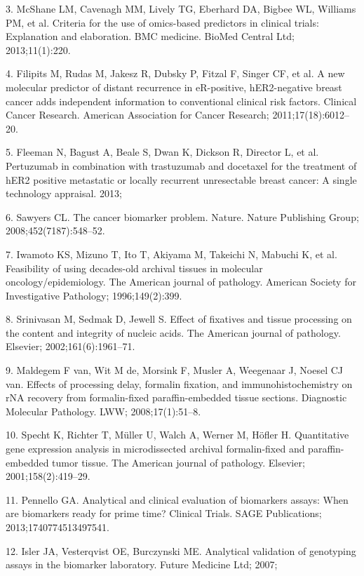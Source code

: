 \documentclass[11pt]{article}
\begin{document}
3. McShane LM, Cavenagh MM, Lively TG, Eberhard DA, Bigbee WL, Williams
PM, et al. Criteria for the use of omics-based predictors in clinical
trials: Explanation and elaboration. BMC medicine. BioMed Central Ltd;
2013;11(1):220.

4. Filipits M, Rudas M, Jakesz R, Dubsky P, Fitzal F, Singer CF, et al.
A new molecular predictor of distant recurrence in eR-positive,
hER2-negative breast cancer adds independent information to conventional
clinical risk factors. Clinical Cancer Research. American Association
for Cancer Research; 2011;17(18):6012--20.

5. Fleeman N, Bagust A, Beale S, Dwan K, Dickson R, Director L, et al.
Pertuzumab in combination with trastuzumab and docetaxel for the
treatment of hER2 positive metastatic or locally recurrent unresectable
breast cancer: A single technology appraisal. 2013;

6. Sawyers CL. The cancer biomarker problem. Nature. Nature Publishing
Group; 2008;452(7187):548--52.

7. Iwamoto KS, Mizuno T, Ito T, Akiyama M, Takeichi N, Mabuchi K, et al.
Feasibility of using decades-old archival tissues in molecular
oncology/epidemiology. The American journal of pathology. American
Society for Investigative Pathology; 1996;149(2):399.

8. Srinivasan M, Sedmak D, Jewell S. Effect of fixatives and tissue
processing on the content and integrity of nucleic acids. The American
journal of pathology. Elsevier; 2002;161(6):1961--71.

9. Maldegem F van, Wit M de, Morsink F, Musler A, Weegenaar J, Noesel CJ
van. Effects of processing delay, formalin fixation, and
immunohistochemistry on rNA recovery from formalin-fixed
paraffin-embedded tissue sections. Diagnostic Molecular Pathology. LWW;
2008;17(1):51--8.

10. Specht K, Richter T, M{ü}ller U, Walch A, Werner M, H{ö}fler H.
Quantitative gene expression analysis in microdissected archival
formalin-fixed and paraffin-embedded tumor tissue. The American journal
of pathology. Elsevier; 2001;158(2):419--29.

11. Pennello GA. Analytical and clinical evaluation of biomarkers
assays: When are biomarkers ready for prime time? Clinical Trials. SAGE
Publications; 2013;1740774513497541.

12. Isler JA, Vesterqvist OE, Burczynski ME. Analytical validation of
genotyping assays in the biomarker laboratory. Future Medicine Ltd;
2007;
\end{document}
